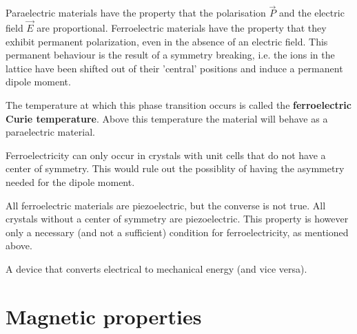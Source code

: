 	Paraelectric materials have the property that the polarisation $\vec{P}$ and the electric field $\vec{E}$ are proportional. Ferroelectric materials have the property that they exhibit permanent polarization, even in the absence of an electric field. This permanent behaviour is the result of a symmetry breaking, i.e. the ions in the lattice have been shifted out of their 'central' positions and induce a permanent dipole moment.
	
    The temperature at which this phase transition occurs is called the \textbf{ferroelectric Curie temperature}. Above this temperature the material will behave as a paraelectric material.
    
   	\begin{remark}
   		Ferroelectricity can only occur in crystals with unit cells that do not have a center of symmetry. This would rule out the possiblity of having the asymmetry needed for the dipole moment.
   	\end{remark}
    

    
	\begin{remark}
		All ferroelectric materials are piezoelectric, but the converse is not true. All crystals without a center of symmetry are piezoelectric. This property is however only a necessary (and not a sufficient) condition for ferroelectricity, as mentioned above.
	\end{remark}

	\begin{example}[Transducer]
		A device that converts electrical to mechanical energy (and vice versa).
	\end{example}
    
\section{Magnetic properties}
	
